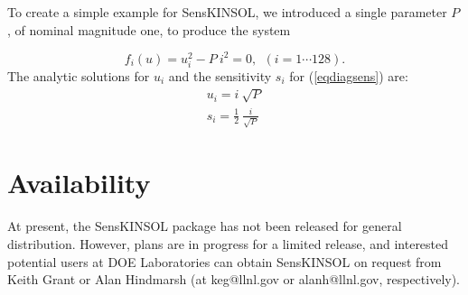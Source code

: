 \documentclass[11pt]{article}
\begin{document}
To create a simple example for SensKINSOL, we introduced a single
parameter $P$, of nominal magnitude one, to produce the system

\begin{equation}
f_i(u) = u_i^2 - P \: i^2 = 0, ~~ (i = 1 \cdots 128).
\label{eqdiagsens}
\end{equation}
The analytic solutions for
$u_i$ and the sensitivity $s_i$ for (\ref{eqdiagsens})  are:
\begin{eqnarray}
u_i = i \: \sqrt{P}\\
s_i = \frac{1}{2} \: \frac{i}{\sqrt{P}}
\end{eqnarray}


\section{Availability}

At present, the SensKINSOL package has not been released for general
distribution. However, plans are in progress for a limited release, and
interested potential users at DOE Laboratories can obtain SensKINSOL on
request from Keith Grant or Alan Hindmarsh (at keg@llnl.gov or
alanh@llnl.gov, respectively).
\end{document}
